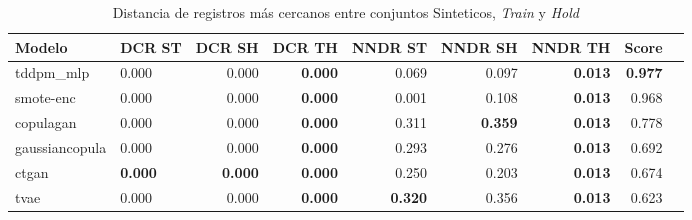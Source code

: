 \begin{table}[H]
\centering
\caption{Distancia de registros más cercanos entre conjuntos Sinteticos, \emph{Train} y \emph{Hold}}
\label{table-dcr-economicos-a-1}
\begin{tabular}{|l|l|r|r|r|r|r|r|r|}
\hline
\rowcolor[gray]{0.8}
Modelo & DCR ST & DCR SH & DCR TH & NNDR ST & NNDR SH & NNDR TH & \textbf{Score} \\
\hline tddpm\_mlp & 0.000 & \cellcolor[rgb]{0.9, 0.54, 0.52} 0.000 & \bfseries 0.000 & 0.069 & 0.097 & \bfseries 0.013 & \bfseries 0.977 \\
\hline smote-enc & \cellcolor[rgb]{0.9, 0.54, 0.52} 0.000 & 0.000 & \bfseries 0.000 & 0.001 & 0.108 & \bfseries 0.013 & 0.968 \\
\hline copulagan & 0.000 & 0.000 & \bfseries 0.000 & 0.311 & \bfseries 0.359 & \bfseries 0.013 & 0.778 \\
\hline gaussiancopula & 0.000 & 0.000 & \bfseries 0.000 & 0.293 & 0.276 & \bfseries 0.013 & 0.692 \\
\hline ctgan & \bfseries 0.000 & \bfseries 0.000 & \bfseries 0.000 & 0.250 & 0.203 & \bfseries 0.013 & 0.674 \\
\hline tvae & 0.000 & 0.000 & \bfseries 0.000 & \bfseries 0.320 & 0.356 & \bfseries 0.013 & 0.623 \\
\hline
\end{tabular}
\end{table}
